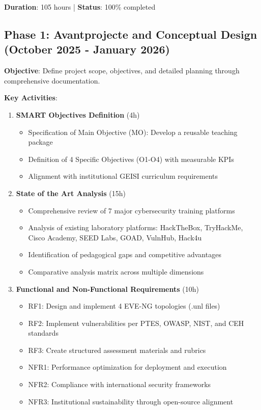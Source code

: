 \textbf{Duration}: 105 hours | \textbf{Status}: 100\% completed

\subsection{Phase 1: Avantprojecte and Conceptual Design (October 2025 - January 2026)}

\textbf{Objective}: Define project scope, objectives, and detailed planning through comprehensive documentation.

\textbf{Key Activities}:

\begin{enumerate}

\item \textbf{SMART Objectives Definition} (4h)
\begin{itemize}
\item Specification of Main Objective (MO): Develop a reusable teaching package
\item Definition of 4 Specific Objectives (O1-O4) with measurable KPIs
\item Alignment with institutional GEISI curriculum requirements
\end{itemize}

\item \textbf{State of the Art Analysis} (15h)
\begin{itemize}
\item Comprehensive review of 7 major cybersecurity training platforms
\item Analysis of existing laboratory platforms: HackTheBox, TryHackMe, Cisco Academy, SEED Labs, GOAD, VulnHub, Hack4u
\item Identification of pedagogical gaps and competitive advantages
\item Comparative analysis matrix across multiple dimensions
\end{itemize}

\item \textbf{Functional and Non-Functional Requirements} (10h)
\begin{itemize}
\item RF1: Design and implement 4 EVE-NG topologies (.unl files)
\item RF2: Implement vulnerabilities per PTES, OWASP, NIST, and CEH standards
\item RF3: Create structured assessment materials and rubrics
\item NFR1: Performance optimization for deployment and execution
\item NFR2: Compliance with international security frameworks
\item NFR3: Institutional sustainability through open-source alignment
\end{itemize}


\end{enumerate}
